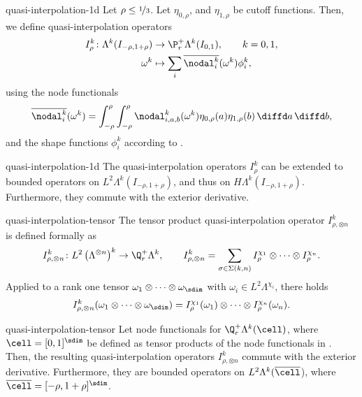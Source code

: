 \begin{Definition}{quasi-interpolation-1d}
  Let $\rho\le \nicefrac13$. Let $\eta_{0,\rho}$, and $\eta_{1,\rho}$ be cutoff
  functions. Then, we define quasi-interpolation operators
  \begin{align}
    I^k_\rho\colon \Lambda^k(I_{-\rho,1+\rho}) &\to \P_r^+\Lambda^k(I_{0,1}),
                                     \qquad k=0,1,\\
    \omega^k & \mapsto \sum_i \overline{\nodal_i^k}(\omega^k) \phi_i^k,
  \end{align}
  using the node functionals
  \begin{gather}
    \overline{\nodal_i^k}(\omega^k)
    = \int_{-\rho}^\rho\int_{-\rho}^\rho \nodal_{i,a,b}^k(\omega^k)
    \eta_{0,\rho}(a)\eta_{1,\rho}(b) \,\diffd a\,\diffd b,
  \end{gather}
  and the shape functions $\phi_i^k$ according to .
\end{Definition}

\begin{Lemma}{quasi-interpolation-1d}
  The quasi-interpolation operators $I_\rho^k$ can be extended to
  bounded operators on $L^2\Lambda^k(I_{-\rho,1+\rho})$, and thus on
  $H\Lambda^k(I_{-\rho,1+\rho})$. Furthermore, they commute with the
  exterior derivative.
\end{Lemma}

\begin{Definition}{quasi-interpolation-tensor}
  The tensor product quasi-interpolation operator
  $I^k_{\rho,\otimes n}$ is defined formally as
  \begin{gather}
    I^k_{\rho,\otimes n}\colon L^2\left(\Lambda^{\otimes n}\right)^k
    \to \Q_r^+\Lambda^k,
    \qquad
    I^k_{\rho,\otimes n} = \sum_{\sigma\in\Sigma(k,n)}
    I^{\chi_1}_\rho \otimes \dots \otimes I^{\chi_n}_\rho.
  \end{gather}
  Applied to a rank one tensor $\omega_1\otimes \dots \otimes \omega_\sdim$ with
  $\omega_i \in L^2\Lambda^{\chi_i}$, there holds
  \begin{gather}
    I^k_{\rho,\otimes n}(\omega_1\otimes \dots \otimes \omega_\sdim)
    = I^{\chi_1}_\rho (\omega_1)\otimes \cdots\otimes I^{\chi_n}_\rho(\omega_n).
  \end{gather}
\end{Definition}

\begin{Theorem}{quasi-interpolation-tensor}
  Let node functionals for $\Q_r^+\Lambda^k(\cell)$, where
  $\cell = [0,1]^\sdim$ be defined as tensor products of the node
  functionals in . Then,
  the resulting quasi-interpolation operators $I_{\rho,\otimes n}^k$ commute with
  the exterior derivative. Furthermore, they are bounded operators on
  $L^2\Lambda^k(\overline\cell$), where $\overline \cell = [-\rho,1+\rho]^\sdim$.
\end{Theorem}

